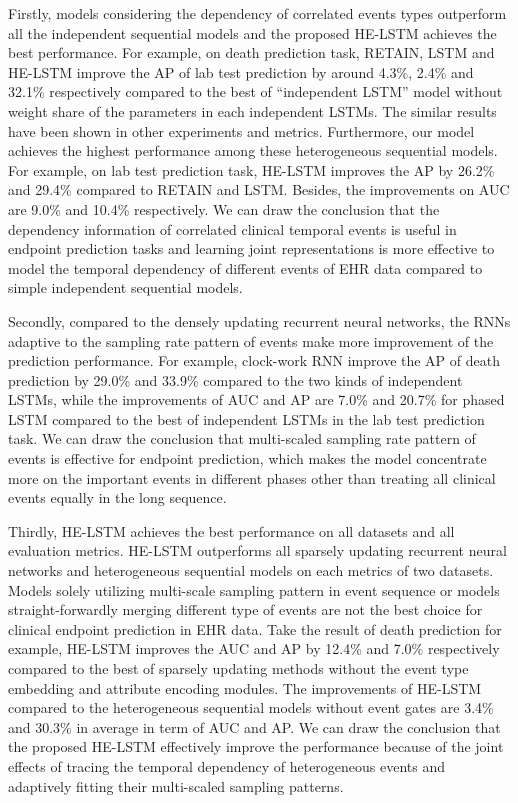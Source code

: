 \documentclass[letterpaper]{article} %
\begin{document}
Firstly, models considering the dependency of correlated events types outperform all the independent sequential models and the proposed HE-LSTM achieves the best performance. For example,  on death prediction task,  RETAIN, LSTM and HE-LSTM improve the AP of lab test prediction by around 4.3\%, 2.4\% and 32.1\% respectively compared to the best of ``independent LSTM'' model without weight share of the parameters in each independent LSTMs. The similar results have been shown in other experiments and metrics. Furthermore, our model achieves the highest performance among these heterogeneous sequential models. For example, on lab test prediction task, HE-LSTM improves the AP by 26.2\% and 29.4\% compared to  RETAIN and LSTM. Besides, the improvements on AUC are 9.0\% and 10.4\% respectively. We can draw the conclusion that the dependency information of correlated clinical temporal events is useful in endpoint prediction tasks and learning joint representations is more effective to model the temporal dependency of different events of EHR data compared to simple independent sequential models.

Secondly, compared to the densely updating recurrent neural networks, the RNNs adaptive to the sampling rate pattern of events make more improvement of the prediction performance.
For example, clock-work RNN  improve the AP of death prediction by 29.0\% and 33.9\% compared to the two kinds of independent LSTMs, while the improvements of AUC and AP are 7.0\% and 20.7\% for phased LSTM compared to the best of independent LSTMs in the lab test prediction task.
We can draw the conclusion that multi-scaled sampling rate pattern of events is effective for endpoint prediction, which makes the model concentrate more on the important events in different phases other than treating all clinical events equally in the long sequence.

Thirdly,  HE-LSTM achieves the best performance on all datasets and all evaluation metrics. HE-LSTM outperforms all sparsely updating recurrent neural networks and heterogeneous sequential models on each metrics of two datasets.
Models solely utilizing multi-scale sampling pattern in event sequence or models straight-forwardly merging different type of events are not the best choice for clinical endpoint prediction in EHR data.
Take the result of death prediction for example, HE-LSTM improves the AUC and AP by 12.4\% and 7.0\% respectively compared to the best of sparsely updating  methods without the event type embedding and attribute encoding modules.
The improvements of HE-LSTM compared to the heterogeneous sequential models without event gates are 3.4\% and 30.3\% in average in term of AUC and AP.
We can draw the conclusion that the proposed HE-LSTM effectively improve the performance because of the joint effects of tracing the temporal dependency of heterogeneous events and adaptively fitting their multi-scaled sampling patterns.
\end{document}
